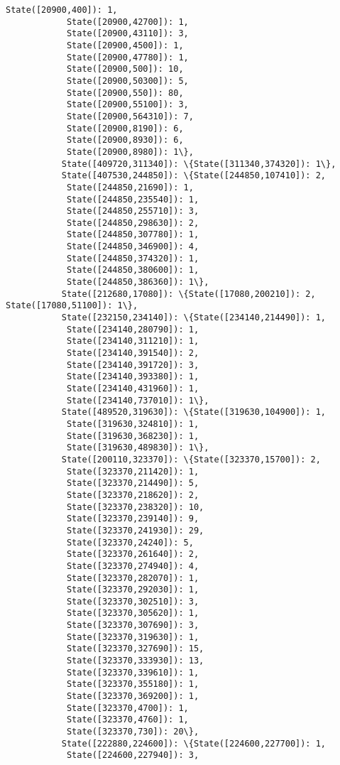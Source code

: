 \documentclass[11pt]{article}
\begin{document}
\begin{Verbatim}[commandchars=\\\{\}]
            State([20900,400]): 1,
            State([20900,42700]): 1,
            State([20900,43110]): 3,
            State([20900,4500]): 1,
            State([20900,47780]): 1,
            State([20900,500]): 10,
            State([20900,50300]): 5,
            State([20900,550]): 80,
            State([20900,55100]): 3,
            State([20900,564310]): 7,
            State([20900,8190]): 6,
            State([20900,8930]): 6,
            State([20900,8980]): 1\},
           State([409720,311340]): \{State([311340,374320]): 1\},
           State([407530,244850]): \{State([244850,107410]): 2,
            State([244850,21690]): 1,
            State([244850,235540]): 1,
            State([244850,255710]): 3,
            State([244850,298630]): 2,
            State([244850,307780]): 1,
            State([244850,346900]): 4,
            State([244850,374320]): 1,
            State([244850,380600]): 1,
            State([244850,386360]): 1\},
           State([212680,17080]): \{State([17080,200210]): 2, State([17080,51100]): 1\},
           State([232150,234140]): \{State([234140,214490]): 1,
            State([234140,280790]): 1,
            State([234140,311210]): 1,
            State([234140,391540]): 2,
            State([234140,391720]): 3,
            State([234140,393380]): 1,
            State([234140,431960]): 1,
            State([234140,737010]): 1\},
           State([489520,319630]): \{State([319630,104900]): 1,
            State([319630,324810]): 1,
            State([319630,368230]): 1,
            State([319630,489830]): 1\},
           State([200110,323370]): \{State([323370,15700]): 2,
            State([323370,211420]): 1,
            State([323370,214490]): 5,
            State([323370,218620]): 2,
            State([323370,238320]): 10,
            State([323370,239140]): 9,
            State([323370,241930]): 29,
            State([323370,24240]): 5,
            State([323370,261640]): 2,
            State([323370,274940]): 4,
            State([323370,282070]): 1,
            State([323370,292030]): 1,
            State([323370,302510]): 3,
            State([323370,305620]): 1,
            State([323370,307690]): 3,
            State([323370,319630]): 1,
            State([323370,327690]): 15,
            State([323370,333930]): 13,
            State([323370,339610]): 1,
            State([323370,355180]): 1,
            State([323370,369200]): 1,
            State([323370,4700]): 1,
            State([323370,4760]): 1,
            State([323370,730]): 20\},
           State([222880,224600]): \{State([224600,227700]): 1,
            State([224600,227940]): 3,

\end{Verbatim}
\end{document}
